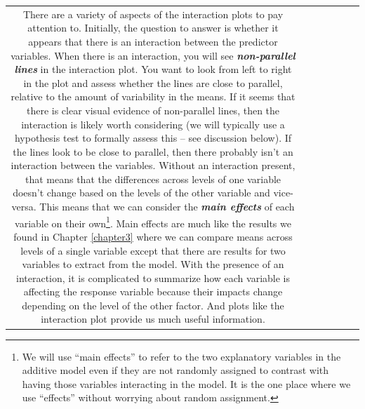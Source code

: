 \documentclass[]{book}
\let\rmarkdownfootnote\footnote%
\def\footnote{\protect\rmarkdownfootnote}
\theoremstyle{definition}
\theoremstyle{definition}
\theoremstyle{remark}
\begin{document}
\begin{longtable}[]{@{}ccccccc@{}}
\begin{minipage}[b]{0.10\columnwidth}
There are a variety of aspects of the interaction plots to pay attention
to. Initially, the question to answer is whether it appears that there
is an interaction between the predictor variables. When there is an
interaction, you will see \textbf{\emph{non-parallel lines}} in the
interaction plot. You want to look from left to right in the plot and
assess whether the lines are close to parallel, relative to the amount
of variability in the means. If it seems that there is clear visual
evidence of non-parallel lines, then the interaction is likely worth
considering (we will typically use a hypothesis test to formally assess
this -- see discussion below). If the lines look to be close to
parallel, then there probably isn't an interaction between the
variables. Without an interaction present, that means that the
differences across levels of one variable doesn't change based on the
levels of the other variable and vice-versa. This means that we can
consider the \textbf{\emph{main effects}} of each variable on their
own\footnote{We will use ``main effects'' to refer to the two
  explanatory variables in the additive model even if they are not
  randomly assigned to contrast with having those variables interacting
  in the model. It is the one place where we use ``effects'' without
  worrying about random assignment.}. Main effects are much like the
results we found in Chapter \ref{chapter3} where we can compare means
across levels of a single variable except that there are results for two
variables to extract from the model. With the presence of an
interaction, it is complicated to summarize how each variable is
affecting the response variable because their impacts change depending
on the level of the other factor. And plots like the interaction plot
provide us much useful information.


\end{minipage}
\end{longtable}
\end{document}
